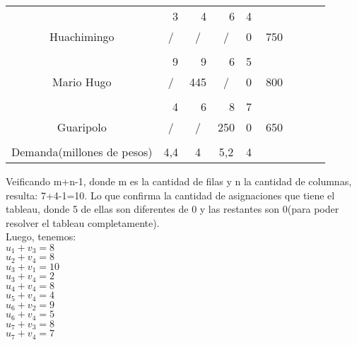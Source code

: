 \documentclass[12pt,letterpaper]{article}
\begin{document}
\begin{center}
\begin{tabular}{ccc|ccc|ccc|ccc|ccc|ccc|ccc}
\cline{1-15}
\multicolumn{3}{c|}{} & \multicolumn{3}{r|}{3} & \multicolumn{3}{r|}{4} & \multicolumn{3}{r|}{6} & \multicolumn{3}{r|}{4} \\
\multicolumn{3}{c|}{Huachimingo} & \multicolumn{3}{c|}{/} & \multicolumn{3}{c|}{/} & \multicolumn{3}{c|}{/} & \multicolumn{3}{c|}{0}& \multicolumn{3}{c}{750}\\
\multicolumn{3}{c|}{} & \multicolumn{3}{c|}{} & \multicolumn{3}{c|}{} & \multicolumn{3}{c|}{} & \multicolumn{3}{c|}{}\\
\cline{1-15}
\multicolumn{3}{c|}{} & \multicolumn{3}{r|}{9} & \multicolumn{3}{r|}{9} & \multicolumn{3}{r|}{6} & \multicolumn{3}{r|}{5} \\
\multicolumn{3}{c|}{Mario Hugo} & \multicolumn{3}{c|}{/} & \multicolumn{3}{c|}{445} & \multicolumn{3}{c|}{/} & \multicolumn{3}{c|}{0}& \multicolumn{3}{c}{800}\\
\multicolumn{3}{c|}{} & \multicolumn{3}{c|}{} & \multicolumn{3}{c|}{} & \multicolumn{3}{c|}{} & \multicolumn{3}{c|}{}\\
\cline{1-15}
\multicolumn{3}{c|}{} & \multicolumn{3}{r|}{4} & \multicolumn{3}{r|}{6} & \multicolumn{3}{r|}{8} & \multicolumn{3}{r|}{7} \\
\multicolumn{3}{c|}{Guaripolo} & \multicolumn{3}{c|}{/} & \multicolumn{3}{c|}{/} & \multicolumn{3}{c|}{250} & \multicolumn{3}{c|}{0}& \multicolumn{3}{c}{650}\\
\multicolumn{3}{c|}{} & \multicolumn{3}{c|}{} & \multicolumn{3}{c|}{} & \multicolumn{3}{c|}{} & \multicolumn{3}{c|}{}\\
\cline{1-15}
\multicolumn{3}{c|}{Demanda(millones de pesos)} & \multicolumn{3}{c|}{4,4} & \multicolumn{3}{c|}{4} & \multicolumn{3}{c|}{5,2}& \multicolumn{3}{c|}{4} & \multicolumn{3}{c}{}\\

\end{tabular}
\end{center}

Veificando m+n-1, donde m es la cantidad de filas y n la cantidad de columnas, resulta: 7+4-1=10. Lo que confirma la cantidad de asignaciones
que tiene el tableau, donde 5 de ellas son diferentes de 0 y las restantes son 0(para poder resolver el tableau completamente).
\\

Luego, tenemos: \\

$u_{1}+v_{3}=8$ \\
$u_{2}+v_{4}=8$ \\
$u_{3}+v_{1}=10$ \\
$u_{3}+v_{4}=2$ \\
$u_{4}+v_{4}=8$ \\
$u_{5}+v_{4}=4$ \\
$u_{6}+v_{2}=9$ \\
$u_{6}+v_{4}=5$ \\
$u_{7}+v_{3}=8$ \\
$u_{7}+v_{4}=7$ \\
\end{document}
